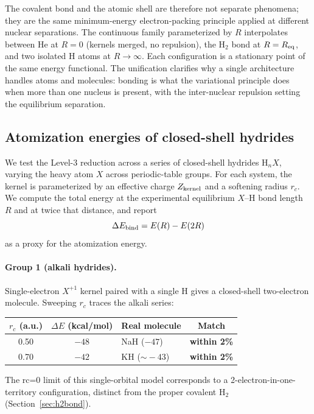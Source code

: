 \documentclass[11pt]{article}
\begin{document}
The covalent bond and the atomic shell are therefore not separate phenomena; they are the same minimum-energy electron-packing principle applied at different nuclear separations. The continuous family parameterized by $R$ interpolates between He at $R = 0$ (kernels merged, no repulsion), the H$_2$ bond at $R = R_{\rm eq}$, and two isolated H atoms at $R \to \infty$. Each configuration is a stationary point of the same energy functional. The unification clarifies why a single architecture handles atoms and molecules: bonding is what the variational principle does when more than one nucleus is present, with the inter-nuclear repulsion setting the equilibrium separation.

\subsection{Atomization energies of closed-shell hydrides}\label{sec:hydrides}

We test the Level-3 reduction across a series of closed-shell hydrides $\mathrm{H}_n X$, varying the heavy atom $X$ across periodic-table groups. For each system, the kernel is parameterized by an effective charge $Z_{\rm kernel}$ and a softening radius $r_c$. We compute the total energy at the experimental equilibrium $X$--H bond length $R$ and at twice that distance, and report
\[
\Delta E_{\rm bind} = E(R) - E(2R)
\]
as a proxy for the atomization energy.

\paragraph{Group 1 (alkali hydrides).}
Single-electron $X^{+1}$ kernel paired with a single H gives a closed-shell two-electron molecule. Sweeping $r_c$ traces the alkali series:

\begin{center}
\begin{tabular}{c c l c}
\toprule
$r_c$ (a.u.) & $\Delta E$ (kcal/mol) & Real molecule & Match \\
\midrule
0.50 & $-48$ & NaH ($-47$) & \textbf{within 2\%} \\
0.70 & $-42$ & KH ($\sim\!-43$) & \textbf{within 2\%} \\
\bottomrule
\end{tabular}
\end{center}
The rc=0 limit of this single-orbital model corresponds to a 2-electron-in-one-territory configuration, distinct from the proper covalent H$_2$ (Section~\ref{sec:h2bond}).
\end{document}
